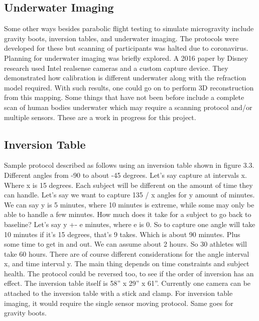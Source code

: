 \subsection{Underwater Imaging}
Some other ways besides parabolic flight testing to simulate microgravity include gravity boots, inversion tables, and underwater imaging. The protocols were developed for these but scanning of participants was halted due to coronavirus. Planning for underwater imaging was briefly explored. A 2016 paper by Disney research \cite{digumarti2016underwater} used Intel realsense cameras and a custom capture device. They demonstrated how calibration is different underwater along with the refraction model required. With such results, one could go on to perform 3D reconstruction from this mapping. Some things that have not been before include a complete scan of human bodies underwater which may require a scanning protocol and/or multiple sensors. These are a work in progress for this project.
\subsection{Inversion Table}
Sample protocol described as follows using an inversion table shown in figure 3.3. Different angles from -90 to about -45 degrees. Let’s say capture at intervals x. Where x is 15 degrees. Each subject will be different on the amount of time they can handle. Let’s say we want to capture 135 / x angles for y amount of minutes. We can say y is 5 minutes, where 10 minutes is extreme, while some may only be able to handle a few minutes. How much does it take for a subject to go back to baseline? Let’s say y +- e minutes, where e is 0. So to capture one angle will take 10 minutes if it’s 15 degrees, that’s 9 takes. Which is about 90 minutes. Plus some time to get in and out. We can assume about 2 hours. So 30 athletes will take 60 hours. There are of course different considerations for the angle interval x, and time interval y. The main thing depends on time constraints and subject health. The protocol could be reversed too, to see if the order of inversion has an effect. The inversion table itself is 58” x 29” x 61”. Currently one camera can be attached to the inversion table with a stick and clamp. For inversion table imaging, it would require the single sensor moving protocol. Same goes for gravity boots. 

